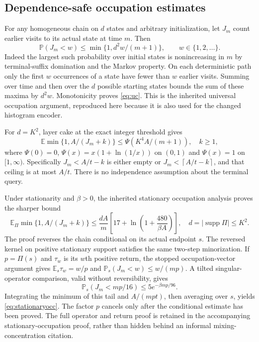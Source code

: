 \documentclass[11pt,letterpaper]{article}
\theoremstyle{definition}\newtheorem{definition}[theorem]{Definition}
\theoremstyle{remark}\newtheorem{remark}[theorem]{Remark}
\newcommand{\E}{\mathbb{E}}
\newcommand{\Prob}{\mathbb{P}}
\newcommand{\ceil}[1]{\left\lceil #1\right\rceil}
\newcommand{\supp}{\operatorname{supp}}
\begin{document}
\subsection{Dependence-safe occupation estimates}
For any homogeneous chain on $d$ states and arbitrary initialization, let $J_m$ count earlier visits to its actual state at time $m$. Then
\begin{equation}\label{eq:uc}
 \Prob(J_m<w)\le\min\{1,d^2w/(m+1)\},\qquad w\in\{1,2,\ldots\}.
\end{equation}
Indeed the largest such probability over initial states is nonincreasing in $m$ by terminal-suffix domination and the Markov property. On each deterministic path only the first $w$ occurrences of a state have fewer than $w$ earlier visits. Summing over time and then over the $d$ possible starting states bounds the sum of these maxima by $d^2w$. Monotonicity proves \eqref{eq:uc}. This is the inherited universal occupation argument, reproduced here because it is also used for the changed histogram encoder.

For $d=K^2$, layer cake at the exact integer threshold gives
\begin{equation}\label{eq:psi}
 \E\min\{1,A/(J_m+k)\}\le\Psi(K^4A/(m+1)),\quad k\ge1,
\end{equation}
where $\Psi(0)=0$, $\Psi(x)=x(1+\ln(1/x))$ on $(0,1)$ and $\Psi(x)=1$ on $[1,\infty)$. Specifically $J_m<A/t-k$ is either empty or $J_m<\ceil{A/t-k}$, and that ceiling is at most $A/t$. There is no independence assumption about the terminal query.

Under stationarity and $\beta>0$, the inherited stationary occupation analysis proves the sharper bound
\begin{equation}\label{eq:stationaryocc}
 \E_\Pi\min\{1,A/(J_m+k)\}
 \le\frac{dA}{m}\left[17+\ln\left(1+\frac{480}{\beta A}\right)\right],
 \quad d=|\supp\Pi|\le K^2.
\end{equation}
The proof reverses the chain conditional on its actual endpoint $s$. The reversed kernel on positive stationary support satisfies the same two-step minorization. If $p=\Pi(s)$ and $\tau_w$ is its $w$th positive return, the stopped occupation-vector argument gives $\E_s\tau_w=w/p$ and $\Prob_s(J_m<w)\le w/(mp)$. A tilted singular-operator comparison, valid without reversibility, gives
\[
 \Prob_s(J_m<mp/16)\le5e^{-\beta mp/96}.
\]
Integrating the minimum of this tail and $A/(mpt)$, then averaging over $s$, yields \eqref{eq:stationaryocc}. The factor $p$ cancels only after the conditional estimate has been proved. The full operator and return proof is retained in the accompanying stationary-occupation proof, rather than hidden behind an informal mixing-concentration citation.
\end{document}
